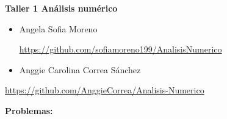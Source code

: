 \documentclass[12pt]{article}
\renewcommand{\_}{\kern-1.5pt\textunderscore\kern-1.5pt}
\begin{document}
\begin{Center}
{\fontsize{14pt}{16.8pt}\selectfont \textbf{Taller 1 Análisis numérico}\par}
\end{Center}\par

\setlength{\parskip}{0.0pt}
\begin{itemize}
	\item Angela Sofia Moreno\par

\begin{justify}
\href{https://github.com/sofiamoreno199/AnalisisNumerico}{https://github.com/sofiamoreno199/AnalisisNumerico}
\end{justify}\par

	\item Anggie Carolina Correa Sánchez
\end{itemize}\par

\begin{justify}
\href{https://github.com/AnggieCorrea/Analisis-Numerico}{https://github.com/AnggieCorrea/Analisis-Numerico}
\end{justify}\par


\vspace{\baselineskip}
\setlength{\parskip}{8.04pt}
\setlength{\parskip}{0.0pt}
\begin{justify}
\textbf{Problemas:}
\end{justify}\par
\end{document}
